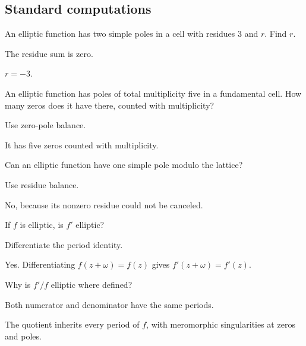 \subsection*{Standard computations}

\begin{exercise}\label{exr:iv28-expand-01}
An elliptic function has two simple poles in a cell with residues \(3\) and \(r\). Find \(r\).
\end{exercise}
\begin{hint}
The residue sum is zero.
\end{hint}
\begin{solution}
\(r=-3\).
\end{solution}

\begin{exercise}\label{exr:iv28-expand-02}
An elliptic function has poles of total multiplicity five in a fundamental cell. How many zeros does it have there, counted with multiplicity?
\end{exercise}
\begin{hint}
Use zero-pole balance.
\end{hint}
\begin{solution}
It has five zeros counted with multiplicity.
\end{solution}

\begin{exercise}\label{exr:iv28-expand-03}
Can an elliptic function have one simple pole modulo the lattice?
\end{exercise}
\begin{hint}
Use residue balance.
\end{hint}
\begin{solution}
No, because its nonzero residue could not be canceled.
\end{solution}

\begin{exercise}\label{exr:iv28-expand-04}
If \(f\) is elliptic, is \(f'\) elliptic?
\end{exercise}
\begin{hint}
Differentiate the period identity.
\end{hint}
\begin{solution}
Yes. Differentiating \(f(z+\omega)=f(z)\) gives \(f'(z+\omega)=f'(z)\).
\end{solution}

\begin{exercise}\label{exr:iv28-expand-05}
Why is \(f'/f\) elliptic where defined?
\end{exercise}
\begin{hint}
Both numerator and denominator have the same periods.
\end{hint}
\begin{solution}
The quotient inherits every period of \(f\), with meromorphic singularities at zeros and poles.
\end{solution}

